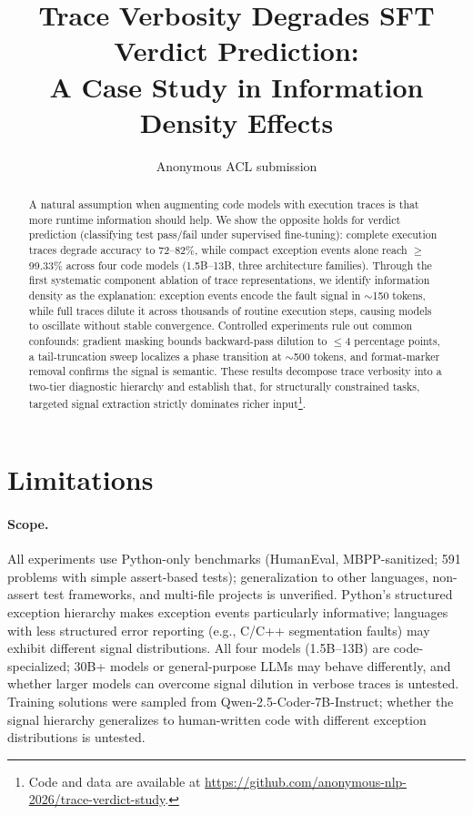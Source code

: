 \documentclass[11pt,a4paper]{article}
\title{Trace Verbosity Degrades SFT Verdict Prediction:\\ A Case Study in Information Density Effects}
\author{Anonymous ACL submission}
\begin{document}
\maketitle

\begin{abstract}
A natural assumption when augmenting code models with execution traces is that more runtime information should help.
We show the opposite holds for verdict prediction (classifying test pass/fail under supervised fine-tuning): complete execution traces degrade accuracy to 72--82\%, while compact exception events alone reach ${\geq}$99.33\% across four code models (1.5B--13B, three architecture families).
Through the first systematic component ablation of trace representations, we identify information density as the explanation: exception events encode the fault signal in ${\sim}$150 tokens, while full traces dilute it across thousands of routine execution steps, causing models to oscillate without stable convergence.
Controlled experiments rule out common confounds: gradient masking bounds backward-pass dilution to ${\leq}$4 percentage points, a tail-truncation sweep localizes a phase transition at ${\sim}$500 tokens, and format-marker removal confirms the signal is semantic.
These results decompose trace verbosity into a two-tier diagnostic hierarchy and establish that, for structurally constrained tasks, targeted signal extraction strictly dominates richer input\footnote{Code and data are available at \url{https://github.com/anonymous-nlp-2026/trace-verdict-study}.}.
\end{abstract}








\section*{Limitations}

\paragraph{Scope.}
All experiments use Python-only benchmarks (HumanEval, MBPP-sanitized; 591 problems with simple assert-based tests); generalization to other languages, non-assert test frameworks, and multi-file projects is unverified.
Python's structured exception hierarchy makes exception events particularly informative; languages with less structured error reporting (e.g., C/C++ segmentation faults) may exhibit different signal distributions.
All four models (1.5B--13B) are code-specialized; 30B+ models or general-purpose LLMs may behave differently, and whether larger models can overcome signal dilution in verbose traces is untested.
Training solutions were sampled from Qwen-2.5-Coder-7B-Instruct; whether the signal hierarchy generalizes to human-written code with different exception distributions is untested.
\end{document}
